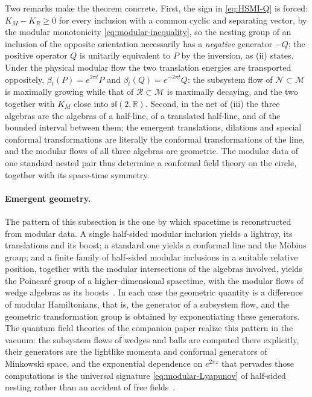 \documentclass[a4paper,11pt]{article}
\theoremstyle{definition}
\begin{document}
Two remarks make the theorem concrete. First, the sign in \eqref{eq:HSMI-Q} is forced: $K_M-K_R\ge0$ for every inclusion with a common cyclic and separating vector, by the modular monotonicity \eqref{eq:modular-inequality}, so the nesting group of an inclusion of the opposite orientation necessarily has a \emph{negative} generator $-Q$; the positive operator $Q$ is unitarily equivalent to $P$ by the inversion, as (ii) states. Under the physical modular flow the two translation energies are transported oppositely, $\beta_t(P)=e^{2\pi t}P$ and $\beta_t(Q)=e^{-2\pi t}Q$: the subsystem flow of $\mathcal N\subset\mathcal M$ is maximally growing while that of $\mathcal R\subset\mathcal M$ is maximally decaying, and the two together with $K_M$ close into $\mathfrak{sl}(2,\mathbb R)$. Second, in the net of (iii) the three algebras are the algebras of a half-line, of a translated half-line, and of the bounded interval between them; the emergent translations, dilations and special conformal transformations are literally the conformal transformations of the line, and the modular flows of all three algebras are geometric. The modular data of one standard nested pair thus determine a conformal field theory on the circle, together with its space-time symmetry.

\paragraph{Emergent geometry.}
The pattern of this subsection is the one by which spacetime is reconstructed from modular data. A single half-sided modular inclusion yields a lightray, its translations and its boost; a standard one yields a conformal line and the M\"obius group; and a finite family of half-sided modular inclusions in a suitable relative position, together with the modular intersections of the algebras involved, yields the Poincar\'e group of a higher-dimensional spacetime, with the modular flows of wedge algebras as its boosts~\cite{KahlerWiesbrock2001}. In each case the geometric quantity is a difference of modular Hamiltonians, that is, the generator of a subsystem flow, and the geometric transformation group is obtained by exponentiating these generators. The quantum field theories of the companion paper realize this pattern in the vacuum: the subsystem flows of wedges and balls are computed there explicitly, their generators are the lightlike momenta and conformal generators of Minkowski space, and the exponential dependence on $e^{2\pi z}$ that pervades those computations is the universal signature \eqref{eq:modular-Lyapunov} of half-sided nesting rather than an accident of free fields~\cite{companionQFT}.
\end{document}

